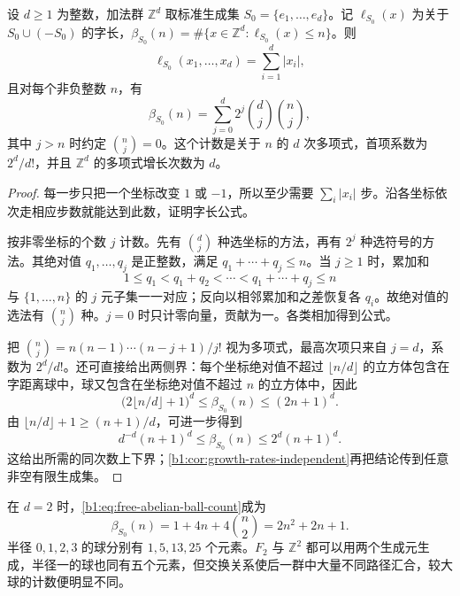 \begin{proposition}\label{b1:prop:free-abelian-growth}
	设 \(d\ge1\) 为整数，加法群 \(\mathbb Z^d\) 取标准生成集 \(S_0=\{e_1,\ldots,e_d\}\)。记 \(\ell_{S_0}(x)\) 为关于 \(S_0\cup(-S_0)\) 的字长，\(\beta_{S_0}(n)=\#\{x\in\mathbb Z^d:\ell_{S_0}(x)\le n\}\)。则
	\[
		\ell_{S_0}(x_1,\ldots,x_d)=\sum_{i=1}^d|x_i|,
	\]
	且对每个非负整数 \(n\)，有
	\begin{equation}\label{b1:eq:free-abelian-ball-count}
		\beta_{S_0}(n)=\sum_{j=0}^{d}2^j\binom{d}{j}\binom{n}{j},
	\end{equation}
	其中 \(j>n\) 时约定 \(\binom{n}{j}=0\)。这个计数是关于 \(n\) 的 \(d\) 次多项式，首项系数为 \(2^d/d!\)，并且 \(\mathbb Z^d\) 的多项式增长次数为 \(d\)。
\end{proposition}
\begin{proof}
	每一步只把一个坐标改变 \(1\) 或 \(-1\)，所以至少需要 \(\sum_i|x_i|\) 步。沿各坐标依次走相应步数就能达到此数，证明字长公式。

	按非零坐标的个数 \(j\) 计数。先有 \(\binom dj\) 种选坐标的方法，再有 \(2^j\) 种选符号的方法。其绝对值 \(q_1,\ldots,q_j\) 是正整数，满足 \(q_1+\cdots+q_j\le n\)。当 \(j\ge1\) 时，累加和
	\[
		1\le q_1<q_1+q_2<\cdots<q_1+\cdots+q_j\le n
	\]
	与 \(\{1,\ldots,n\}\) 的 \(j\) 元子集一一对应；反向以相邻累加和之差恢复各 \(q_i\)。故绝对值的选法有 \(\binom nj\) 种。\(j=0\) 时只计零向量，贡献为一。各类相加得到公式。

	把 \(\binom nj=n(n-1)\cdots(n-j+1)/j!\) 视为多项式，最高次项只来自 \(j=d\)，系数为 \(2^d/d!\)。还可直接给出两侧界：每个坐标绝对值不超过 \(\lfloor n/d\rfloor\) 的立方体包含在字距离球中，球又包含在坐标绝对值不超过 \(n\) 的立方体中，因此
	\[
		\bigl(2\lfloor n/d\rfloor+1\bigr)^d
		\le\beta_{S_0}(n)\le(2n+1)^d.
	\]
	由 \(\lfloor n/d\rfloor+1\ge(n+1)/d\)，可进一步得到
	\[
		d^{-d}(n+1)^d\le\beta_{S_0}(n)\le2^d(n+1)^d.
	\]
	这给出所需的同次数上下界；\cref{b1:cor:growth-rates-independent}再把结论传到任意非空有限生成集。
\end{proof}

在 \(d=2\) 时，\eqref{b1:eq:free-abelian-ball-count}成为
\[
	\beta_{S_0}(n)=1+4n+4\binom n2=2n^2+2n+1.
\]
半径 \(0,1,2,3\) 的球分别有 \(1,5,13,25\) 个元素。\(F_2\) 与 \(\mathbb Z^2\) 都可以用两个生成元生成，半径一的球也同有五个元素，但交换关系使后一群中大量不同路径汇合，较大球的计数便明显不同。

